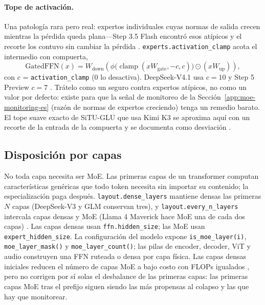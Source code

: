 \paragraph{Tope de activación.}
Una patología rara pero real: expertos individuales cuyas normas de salida
crecen mientras la pérdida queda plana---Step 3.5 Flash encontró esos atípicos
y el recorte los contuvo sin cambiar la pérdida \citep{huang2026step35}.
\texttt{experts.activation\_clamp} acota el intermedio con compuerta,
\begin{equation}
  \mathrm{GatedFFN}(x) = W_{\text{down}}\!\left(
  \phi\bigl(\operatorname{clamp}(xW_{\text{gate}}, -c, c)\bigr) \odot (xW_{\text{up}})
  \right),
\end{equation}
con $c$ = \texttt{activation\_clamp} ($0$ lo desactiva). DeepSeek-V4.1 usa
$c = 10$ y Step 5 Preview $c = 7$ \citep{deepseek2026v4flash}. Trátelo como un
seguro contra expertos atípicos, no como un valor por defecto: existe para que
la señal de monitoreo de la Sección~\ref{app:moe-monitoring-es} (razón de
normas de expertos creciendo) tenga un remedio barato. El tope suave exacto de
SiTU-GLU que usa Kimi K3 se aproxima aquí con un recorte de la entrada de la
compuerta y se documenta como desviación \citep{kimiteam2026k3}.

\subsection{Disposición por capas}
\label{app:moe-layout-es}

No toda capa necesita ser MoE. Las primeras capas de un transformer computan
características genéricas que todo token necesita sin importar su contenido; la
especialización paga después. \texttt{layout.dense\_layers} mantiene densas las
primeras $N$ capas (DeepSeek-V3 y GLM conservan tres), y
\texttt{layout.every\_n\_layers} intercala capas densas y MoE (Llama 4
Maverick hace MoE una de cada dos capas)
\citep{deepseek2024v3,meta2025llama4}. Las capas densas usan
\texttt{ffn.hidden\_size}; las MoE usan \texttt{expert\_hidden\_size}. La
configuración del modelo expone \texttt{is\_moe\_layer(i)},
\texttt{moe\_layer\_mask()} y \texttt{moe\_layer\_count()}; las pilas de
encoder, decoder, ViT y audio construyen una FFN ruteada o densa por capa
física. Las capas densas iniciales reducen el número de capas MoE a bajo costo
con FLOPs igualados \citep{krajewski2025scaling}, pero no corrigen por sí
solas el desbalance de las primeras capas: las primeras capas MoE tras el
prefijo siguen siendo las más propensas al colapso y las que hay que
monitorear.

